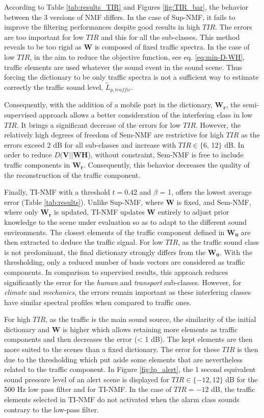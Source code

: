 \documentclass[twocolumn]{svjour3}          %
\begin{document}
According to Table \ref{tab:results_TIR} and Figures \ref{fig:TIR_bar}, the behavior between the 3 versions of NMF differs. In the case of Sup-NMF, it fails to improve the filtering performances despite good results in high $TIR$. The errors are too important for low $TIR$ and this for all the sub-classes. This method reveals to be too rigid as $\mathbf{W}$ is composed of fixed traffic spectra. In the case of low $TIR$, in the aim to reduce the objective function, see eq. \ref{eq:min-D-WH}, traffic elements are used whatever the sound event in the  sound scene. Thus forcing the dictionary to be only traffic spectra is not a sufficient way to estimate correctly the traffic sound level, $\tilde{L}_{p,traffic}$.

Consequently, with the addition of a mobile part in the dictionary, $\mathbf{W_r}$, the semi-supervised approach  allows a better consideration of the interfering class in low $TIR$. It brings a significant decrease of the errors for low $TIR$. However, the relatively high degrees of freedom of Sem-NMF are restrictive for high $TIR$ as the errors exceed 2 dB for all sub-classes and increase with $TIR \in \lbrace$6, 12$\rbrace$ dB. In order to reduce $D(\mathbf{V} \vert \vert \mathbf{WH}$), without constraint, Sem-NMF is free to include traffic components in $\mathbf{W_r}$. Consequently, this behavior decreases the quality of the reconstruction of the traffic component. 

Finally, TI-NMF with a threshold $t = 0.42$ and $\beta$ = 1, offers the lowest average error (Table \ref{tab:results}). Unlike Sup-NMF, where $\mathbf{W}$ is fixed, and Sem-NMF, where only $\mathbf{W_r}$ is updated, TI-NMF updates $\mathbf{W}$ entirely to adjust prior knowledge to the scene under evaluation so as to adapt to the different sound environments. The closest elements of the traffic component defined in $\mathbf{W_0}$ are then extracted to deduce the traffic signal. 
For low $TIR$, as the traffic sound class is not predominant, the final dictionary strongly differs from the $\mathbf{W_0}$. With the thresholding, only a reduced number of basis vectors are considered as traffic components. In comparison to supervised results, this approach reduces significantly the error for the \textit{human} and \textit{transport} sub-classes.  However, for \textit{climate} and \textit{mechanics}, the errors remain important as these interfering classes have similar spectral profiles when compared to traffic ones.

For high $TIR$, as the traffic is the main sound source, the similarity of the initial dictionary and $\mathbf{W}$ is higher which allows retaining more elements as traffic components and then decreases the error (< 1 dB). The kept elements are then more suited to the scenes than a fixed dictionary. The error for these $TIR$ is then due to the thresholding which put aside some elements that are nevertheless related to the traffic component. In Figure \ref{fig:lp_alert}, the 1 second equivalent sound pressure level of an alert scene is displayed for $TIR \in \lbrace -12,12 \rbrace$ dB for the 500 Hz low pass filter and for TI-NMF. In the case of $TIR=-12$ dB, the traffic elements selected in TI-NMF do not activated when the alarm class sounds contrary to the low-pass filter.
\end{document}
